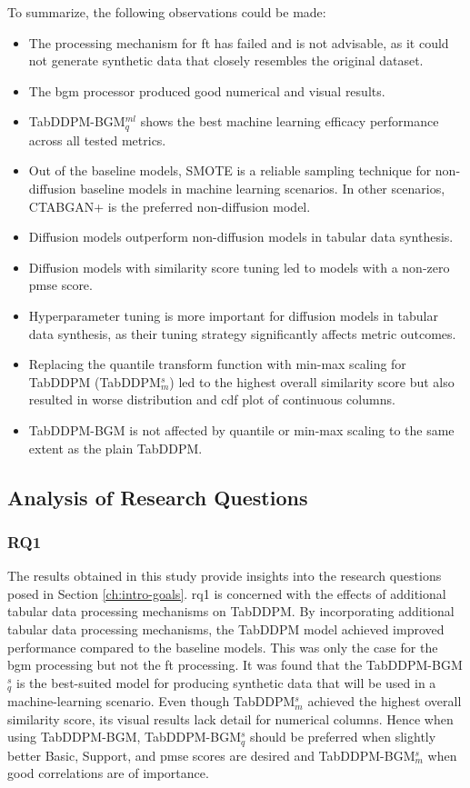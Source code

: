 To summarize, the following observations could be made:

\begin{itemize}
	\item The processing mechanism for \gls{ft} has failed and is not advisable, as it could not generate synthetic data that closely resembles the original dataset.
	\item The \gls{bgm} processor produced good numerical and visual results.
	\item TabDDPM-BGM$^{ml}_q$ shows the best machine learning efficacy performance across all tested metrics.
	\item Out of the baseline models, SMOTE is a reliable sampling technique for non-diffusion baseline models in machine learning scenarios.
	In other scenarios, CTABGAN+ is the preferred non-diffusion model.
	\item Diffusion models outperform non-diffusion models in tabular data synthesis.
	\item Diffusion models with similarity score tuning led to models with a non-zero \gls{pmse} score.
	\item Hyperparameter tuning is more important for diffusion models in tabular data synthesis, as their tuning strategy significantly affects metric outcomes.
	\item Replacing the quantile transform function with min-max scaling for TabDDPM (TabDDPM$^{s}_m$) led to the highest overall similarity score but also resulted in worse distribution and \gls{cdf} plot of continuous columns.
	\item TabDDPM-BGM is not affected by quantile or min-max scaling to the same extent as the plain TabDDPM.
\end{itemize}

\subsection*{Analysis of Research Questions}

\subsubsection{RQ1}

The results obtained in this study provide insights into the research questions posed in Section \ref{ch:intro-goals}.
\gls{rq}1 is concerned with the effects of additional tabular data processing mechanisms on TabDDPM.
By incorporating additional tabular data processing mechanisms, the TabDDPM model achieved improved performance compared to the baseline models.
This was only the case for the \gls{bgm} processing but not the \gls{ft} processing.
It was found that the TabDDPM-BGM$^{s}_q$ is the best-suited model for producing synthetic data that will be used in a machine-learning scenario.
Even though TabDDPM$^{s}_m$ achieved the highest overall similarity score, its visual results lack detail for numerical columns.
Hence when using TabDDPM-BGM, TabDDPM-BGM$^{s}_q$ should be preferred when slightly better Basic, Support, and \gls{pmse} scores are desired and TabDDPM-BGM$^{s}_m$ when good correlations are of importance.

